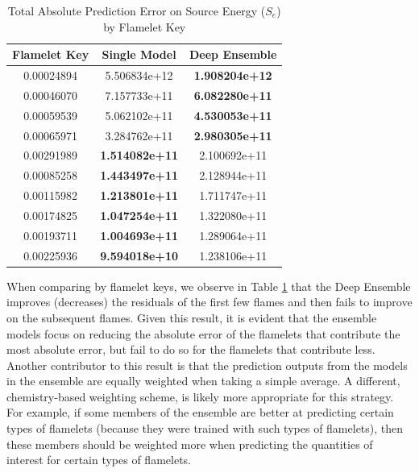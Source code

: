 \documentclass[conf]{new-aiaa}
\begin{document}
\begin{table}[H]
    \caption{Total Absolute Prediction Error on Source Energy (${S}_{e}$) by Flamelet Key}
    \label{tab:top10_flamelets_sm_vs_ensemble_flames}
    \centering
    \begin{tabular}{|c|c|c|}
         \hline
        Flamelet Key &  Single Model & Deep Ensemble \\
         \hline
          0.00024894 &              5.506834e+12 &               \textbf{1.908204e+12} \\
   0.00046070 &              7.157733e+11 &              \textbf{ 6.082280e+11} \\
   0.00059539 &              5.062102e+11 &             \textbf{  4.530053e+11} \\
   0.00065971 &              3.284762e+11 &              \textbf{ 2.980305e+11} \\
   0.00291989 &            \textbf{  1.514082e+11 }&               2.100692e+11 \\
   0.00085258 &             \textbf{ 1.443497e+11} &               2.128944e+11 \\
   0.00115982 &             \textbf{ 1.213801e+11} &               1.711747e+11 \\
   0.00174825 &            \textbf{  1.047254e+11} &               1.322080e+11 \\
   0.00193711 &             \textbf{ 1.004693e+11} &               1.289064e+11 \\
   0.00225936 &             \textbf{ 9.594018e+10} &               1.238106e+11 \\
    \hline
    \end{tabular}
\end{table}

When comparing by flamelet keys, we observe in Table  \ref{tab:top10_flamelets_sm_vs_ensemble_flames} that the Deep Ensemble improves (decreases) the residuals of the first few flames and then fails to improve on the subsequent flames. Given this result, it is evident that the ensemble models focus on reducing the absolute error of the flamelets that contribute the most absolute error, but fail to do so for the flamelets that contribute less. Another contributor to this result is that the prediction outputs from the models in the ensemble are equally weighted when taking a simple average. A different, chemistry-based weighting scheme, is likely more appropriate for this strategy. For example, if some members of the ensemble are better at predicting certain types of flamelets (because they were trained with such types of flamelets), then these members should be weighted more when predicting the quantities of interest for certain types of flamelets.
\end{document}
